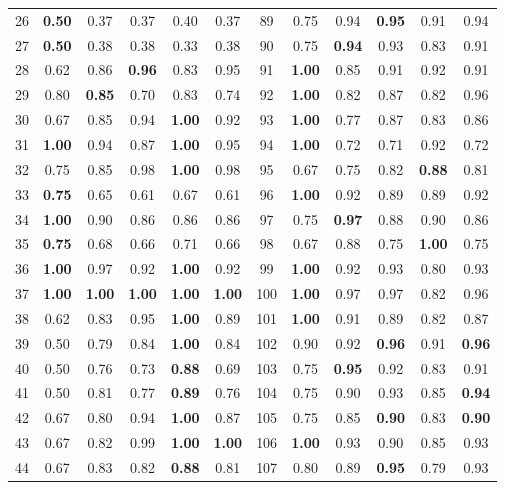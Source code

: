 \documentclass{article}
\begin{document}
{\begin{longtable}{cccccc@{\qquad}cccccc}
26 & \textbf{0.50} & 0.37 & 0.37 & 0.40 & 0.37 & 89 & 0.75 & 0.94 & \textbf{0.95} & 0.91 & 0.94 \\
27 & \textbf{0.50} & 0.38 & 0.38 & 0.33 & 0.38 & 90 & 0.75 & \textbf{0.94} & 0.93 & 0.83 & 0.91 \\
28 & 0.62 & 0.86 & \textbf{0.96} & 0.83 & 0.95 & 91 & \textbf{1.00} & 0.85 & 0.91 & 0.92 & 0.91 \\
29 & 0.80 & \textbf{0.85} & 0.70 & 0.83 & 0.74 & 92 & \textbf{1.00} & 0.82 & 0.87 & 0.82 & 0.96 \\
30 & 0.67 & 0.85 & 0.94 & \textbf{1.00} & 0.92 & 93 & \textbf{1.00} & 0.77 & 0.87 & 0.83 & 0.86 \\
31 & \textbf{1.00} & 0.94 & 0.87 & \textbf{1.00} & 0.95 & 94 & \textbf{1.00} & 0.72 & 0.71 & 0.92 & 0.72 \\
32 & 0.75 & 0.85 & 0.98 & \textbf{1.00} & 0.98 & 95 & 0.67 & 0.75 & 0.82 & \textbf{0.88} & 0.81 \\
33 & \textbf{0.75} & 0.65 & 0.61 & 0.67 & 0.61 & 96 & \textbf{1.00} & 0.92 & 0.89 & 0.89 & 0.92 \\
34 & \textbf{1.00} & 0.90 & 0.86 & 0.86 & 0.86 & 97 & 0.75 & \textbf{0.97} & 0.88 & 0.90 & 0.86 \\
35 & \textbf{0.75} & 0.68 & 0.66 & 0.71 & 0.66 & 98 & 0.67 & 0.88 & 0.75 & \textbf{1.00} & 0.75 \\
36 & \textbf{1.00} & 0.97 & 0.92 & \textbf{1.00} & 0.92 & 99 & \textbf{1.00} & 0.92 & 0.93 & 0.80 & 0.93 \\
37 & \textbf{1.00} & \textbf{1.00} & \textbf{1.00} & \textbf{1.00} & \textbf{1.00} & 100 & \textbf{1.00} & 0.97 & 0.97 & 0.82 & 0.96 \\
38 & 0.62 & 0.83 & 0.95 & \textbf{1.00} & 0.89 & 101 & \textbf{1.00} & 0.91 & 0.89 & 0.82 & 0.87 \\
39 & 0.50 & 0.79 & 0.84 & \textbf{1.00} & 0.84 & 102 & 0.90 & 0.92 & \textbf{0.96} & 0.91 & \textbf{0.96} \\
40 & 0.50 & 0.76 & 0.73 & \textbf{0.88} & 0.69 & 103 & 0.75 & \textbf{0.95} & 0.92 & 0.83 & 0.91 \\
41 & 0.50 & 0.81 & 0.77 & \textbf{0.89} & 0.76 & 104 & 0.75 & 0.90 & 0.93 & 0.85 & \textbf{0.94} \\
42 & 0.67 & 0.80 & 0.94 & \textbf{1.00} & 0.87 & 105 & 0.75 & 0.85 & \textbf{0.90} & 0.83 & \textbf{0.90} \\
43 & 0.67 & 0.82 & 0.99 & \textbf{1.00} & \textbf{1.00} & 106 & \textbf{1.00} & 0.93 & 0.90 & 0.85 & 0.93 \\
44 & 0.67 & 0.83 & 0.82 & \textbf{0.88} & 0.81 & 107 & 0.80 & 0.89 & \textbf{0.95} & 0.79 & 0.93 \\

\end{longtable}}
\end{document}
